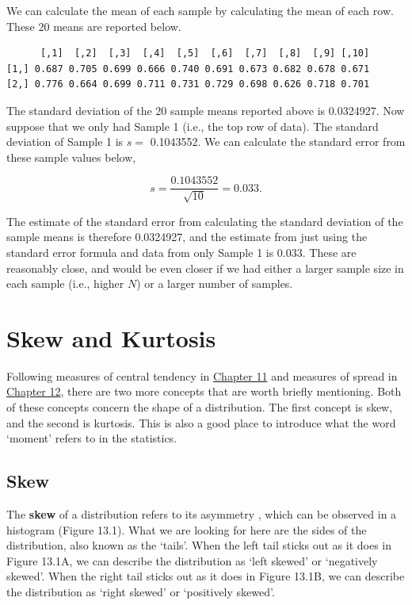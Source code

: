 \documentclass[
  openany]{scrbook}
\begin{document}
We can calculate the mean of each sample by calculating the mean of each row.
These 20 means are reported below.

\begin{verbatim}
      [,1]  [,2]  [,3]  [,4]  [,5]  [,6]  [,7]  [,8]  [,9] [,10]
[1,] 0.687 0.705 0.699 0.666 0.740 0.691 0.673 0.682 0.678 0.671
[2,] 0.776 0.664 0.699 0.711 0.731 0.729 0.698 0.626 0.718 0.701
\end{verbatim}

The standard deviation of the 20 sample means reported above is 0.0324927.
Now suppose that we only had Sample 1 (i.e., the top row of data).
The standard deviation of Sample 1 is \(s =\) 0.1043552.
We can calculate the standard error from these sample values below,

\[s = \frac{0.1043552}{\sqrt{10}} = 0.033.\]

The estimate of the standard error from calculating the standard deviation of the sample means is therefore 0.0324927, and the estimate from just using the standard error formula and data from only Sample 1 is 0.033.
These are reasonably close, and would be even closer if we had either a larger sample size in each sample (i.e., higher \(N\)) or a larger number of samples.

\hypertarget{skew-and-kurtosis}{%
\chapter{Skew and Kurtosis}\label{skew-and-kurtosis}}

Following measures of central tendency in \protect\hyperlink{Chapter_11}{Chapter 11} and measures of spread in \protect\hyperlink{Chapter_12}{Chapter 12}, there are two more concepts that are worth briefly mentioning.
Both of these concepts concern the shape of a distribution.
The first concept is skew, and the second is kurtosis.
This is also a good place to introduce what the word `moment' refers to in the statistics.

\hypertarget{skew}{%
\section{Skew}\label{skew}}

The \textbf{skew} of a distribution refers to its asymmetry \citep{Sokal1995, Dytham2011}, which can be observed in a histogram (Figure 13.1).
What we are looking for here are the sides of the distribution, also known as the `tails'.
When the left tail sticks out as it does in Figure 13.1A, we can describe the distribution as `left skewed' or `negatively skewed'.
When the right tail sticks out as it does in Figure 13.1B, we can describe the distribution as `right skewed' or `positively skewed'.
\end{document}
